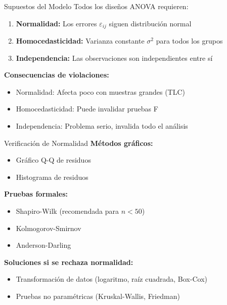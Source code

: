 \documentclass[aspectratio=169]{beamer}
\begin{document}
\begin{frame}{Supuestos del Modelo}
Todos los diseños ANOVA requieren:

\begin{enumerate}
\item \textbf{Normalidad:} Los errores $\varepsilon_{ij}$ siguen distribución normal
\item \textbf{Homocedasticidad:} Varianza constante $\sigma^2$ para todos los grupos
\item \textbf{Independencia:} Las observaciones son independientes entre sí
\end{enumerate}

\vspace{0.3cm}
\textbf{Consecuencias de violaciones:}
\begin{itemize}
\item Normalidad: Afecta poco con muestras grandes (TLC)
\item Homocedasticidad: Puede invalidar pruebas F
\item Independencia: Problema serio, invalida todo el análisis
\end{itemize}
\end{frame}

\begin{frame}{Verificación de Normalidad}
\textbf{Métodos gráficos:}
\begin{itemize}
\item Gráfico Q-Q de residuos
\item Histograma de residuos
\end{itemize}

\vspace{0.3cm}
\textbf{Pruebas formales:}
\begin{itemize}
\item Shapiro-Wilk (recomendada para $n < 50$)
\item Kolmogorov-Smirnov
\item Anderson-Darling
\end{itemize}

\vspace{0.3cm}
\textbf{Soluciones si se rechaza normalidad:}
\begin{itemize}
\item Transformación de datos (logaritmo, raíz cuadrada, Box-Cox)
\item Pruebas no paramétricas (Kruskal-Wallis, Friedman)
\end{itemize}
\end{frame}
\end{document}
